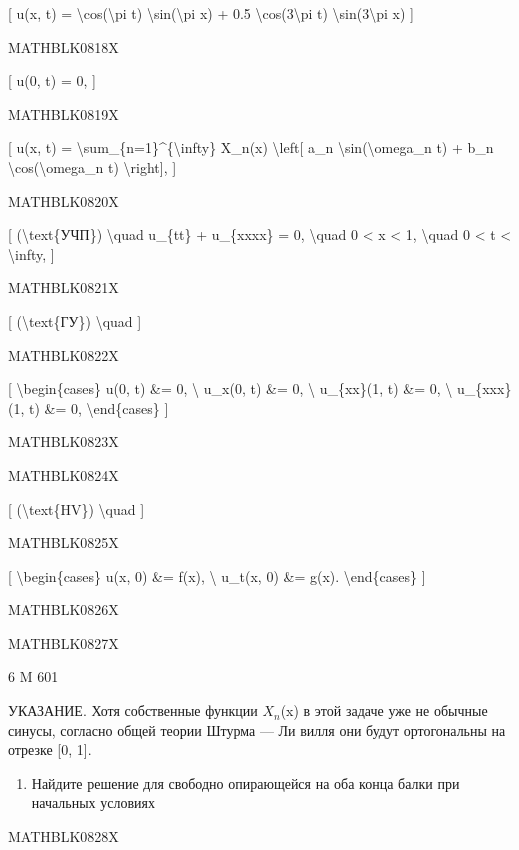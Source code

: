 \documentclass[
]{article}
\providecommand{\tightlist}{%
  \setlength{\itemsep}{0pt}\setlength{\parskip}{0pt}}
\begin{document}
{[} u(x, t) = \textbackslash cos(\textbackslash pi t)
\textbackslash sin(\textbackslash pi x) + 0.5
\textbackslash cos(3\textbackslash pi t)
\textbackslash sin(3\textbackslash pi x) {]}

MATHBLK0818X

{[} u(0, t) = 0, {]}

MATHBLK0819X

{[} u(x, t) = \textbackslash sum\_\{n=1\}\^{}\{\textbackslash infty\}
X\_n(x) \textbackslash left{[} a\_n
\textbackslash sin(\textbackslash omega\_n t) + b\_n
\textbackslash cos(\textbackslash omega\_n t) \textbackslash right{]},
{]}

MATHBLK0820X

{[} (\textbackslash text\{УЧП\}) \textbackslash quad u\_\{tt\} +
u\_\{xxxx\} = 0, \textbackslash quad 0 \textless{} x \textless{} 1,
\textbackslash quad 0 \textless{} t \textless{} \textbackslash infty,
{]}

MATHBLK0821X

{[} (\textbackslash text\{ГУ\}) \textbackslash quad {]}

MATHBLK0822X

{[} \textbackslash begin\{cases\} u(0, t) \&= 0, \textbackslash{}
u\_x(0, t) \&= 0, \textbackslash{} u\_\{xx\}(1, t) \&= 0,
\textbackslash{} u\_\{xxx\}(1, t) \&= 0, \textbackslash end\{cases\} {]}

MATHBLK0823X

MATHBLK0824X

{[} (\textbackslash text\{HV\}) \textbackslash quad {]}

MATHBLK0825X

{[} \textbackslash begin\{cases\} u(x, 0) \&= f(x), \textbackslash{}
u\_t(x, 0) \&= g(x). \textbackslash end\{cases\} {]}

MATHBLK0826X

MATHBLK0827X

6 M 601

УКАЗАНИЕ. Хотя собственные функции \(X_n\)(x) в этой задаче уже не
обычные синусы, согласно общей теории Штурма --- Ли вилля они будут
ортогональны на отрезке {[}0, 1{]}.

\begin{enumerate}
\def\labelenumi{\arabic{enumi}.}
\setcounter{enumi}{1}
\tightlist
\item
  Найдите решение для свободно опирающейся на оба конца балки при
  начальных условиях
\end{enumerate}

MATHBLK0828X
\end{document}
